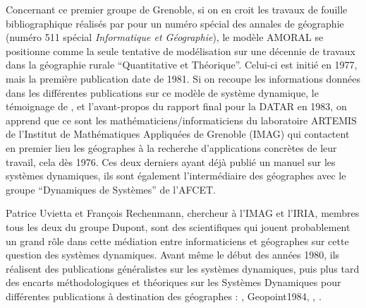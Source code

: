 Concernant ce premier groupe de Grenoble, si on en croit les travaux de fouille bibliographique réalisés par \textcite{Rey1983} pour un numéro spécial des annales de géographie (numéro 511 spécial \textit{Informatique et Géographie}), le modèle AMORAL se positionne comme la seule tentative de modélisation sur une décennie de travaux dans la géographie rurale \enquote{Quantitative et Théorique}. Celui-ci est initié en 1977, mais la première publication date de 1981. Si on recoupe les informations données dans les différentes publications sur ce modèle de système dynamique, le témoignage de \textcite{LeBerre1987}, et l'avant-propos du rapport final pour la DATAR en 1983, on apprend que ce sont les mathématiciens/informaticiens du laboratoire ARTEMIS de l’Institut de Mathématiques Appliquées de Grenoble (IMAG) qui contactent en premier lieu les géographes à la recherche d’applications concrètes de leur travail, cela dès 1976. Ces deux derniers ayant déjà publié un manuel sur les systèmes dynamiques, ils sont également l'intermédiaire des géographes avec le groupe \enquote{Dynamiques de Systèmes} de l'AFCET.

Patrice Uvietta et François Rechenmann, chercheur à l'IMAG et l'IRIA, membres tous les deux du groupe Dupont, sont des scientifiques qui jouent probablement un grand rôle dans cette médiation entre informaticiens et géographes sur cette question des systèmes dynamiques. Avant même le début des années 1980, ils réalisent des publications généralistes \autocite{Rechenmann1977} sur les systèmes dynamiques, puis plus tard des encarts méthodologiques et théoriques sur les Systèmes Dynamiques pour différentes publications à destination des géographes : \autocite{Rechenmann1976}, Geopoint1984, \autocite{CGR1983}, \autocite{Guermond1984}.

